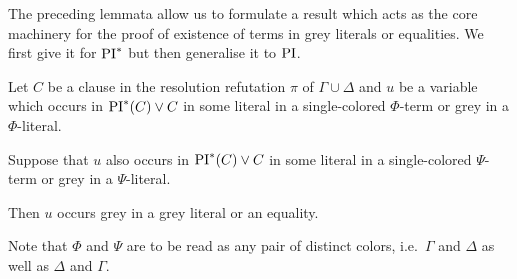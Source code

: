 \documentclass[,%
	draft=false,%
	numbers=noendperiod
	12pt,
	a4paper,
	oneside,%
	openany,
]{memoir}
\begin{document}
The preceding lemmata allow us to formulate a result which acts as the core machinery for the proof of existence of terms in grey literals or equalities. We first give it for $\operatorname{PI}^*$ but then generalise it to $\operatorname{PI}$.

\begin{lemma}
	\label{lemma:col_change_and_grey_in_col_lit_star}
	Let $C$ be a clause in the resolution refutation $\pi$ of $\Gamma \cup \Delta$
	and $u$ be a variable which occurs in $\operatorname{PI}^*(C)\lor C$ in some literal in a single-colored $\Phi$-term or grey in a $\Phi$-literal.

	Suppose that $u$ also occurs in $\operatorname{PI}^*(C) \lor C$ in some literal in a single-colored $\Psi$-term or grey in a $\Psi$-literal.

	Then $u$ occurs grey in a grey literal or an equality.
\end{lemma}
Note that $\Phi$ and $\Psi$ are to be read as any pair of distinct colors, i.e.\ $\Gamma$ and $\Delta$ as well as $\Delta$ and $\Gamma$.
\end{document}
